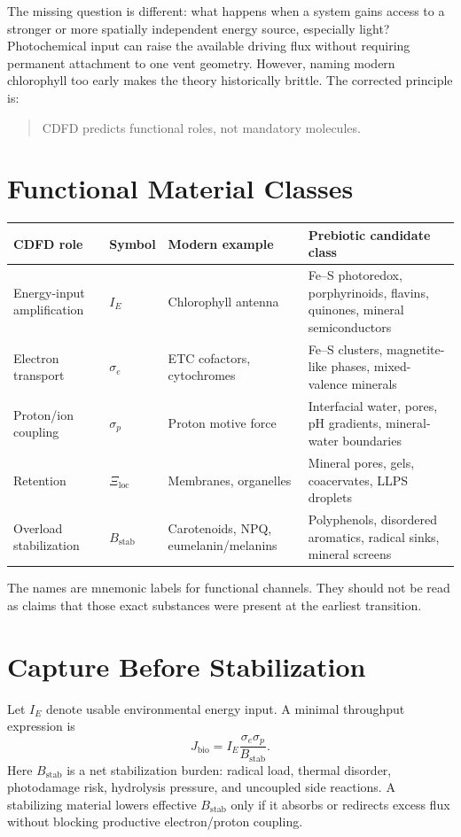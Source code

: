 \documentclass[11pt,a4paper]{article}
\begin{document}
The missing question is different: what happens when a system gains access to a stronger or more spatially independent energy source, especially light? Photochemical input can raise the available driving flux without requiring permanent attachment to one vent geometry. However, naming modern chlorophyll too early makes the theory historically brittle. The corrected principle is:
\begin{quote}
CDFD predicts functional roles, not mandatory molecules.
\end{quote}

\section{Functional Material Classes}
\begin{center}
\small
\begin{tabular}{p{}p{}p{}p{}}
\toprule
CDFD role & Symbol & Modern example & Prebiotic candidate class \\
\midrule
Energy-input amplification & $I_E$ & Chlorophyll antenna & Fe--S photoredox, porphyrinoids, flavins, quinones, mineral semiconductors \\
Electron transport & $\sigma_e$ & ETC cofactors, cytochromes & Fe--S clusters, magnetite-like phases, mixed-valence minerals \\
Proton/ion coupling & $\sigma_p$ & Proton motive force & Interfacial water, pores, pH gradients, mineral-water boundaries \\
Retention & $\Xi_{\mathrm{loc}}$ & Membranes, organelles & Mineral pores, gels, coacervates, LLPS droplets \\
Overload stabilization & $B_{\mathrm{stab}}$ & Carotenoids, NPQ, eumelanin/melanins & Polyphenols, disordered aromatics, radical sinks, mineral screens \\
\bottomrule
\end{tabular}
\end{center}
The names are mnemonic labels for functional channels. They should not be read as claims that those exact substances were present at the earliest transition.

\section{Capture Before Stabilization}
Let $I_E$ denote usable environmental energy input. A minimal throughput expression is
\begin{equation}
 J_{\mathrm{bio}}=I_E\frac{\sigma_e\sigma_p}{B_{\mathrm{stab}}}.
 \label{eq:functional-throughput}
\end{equation}
Here $B_{\mathrm{stab}}$ is a net stabilization burden: radical load, thermal disorder, photodamage risk, hydrolysis pressure, and uncoupled side reactions. A stabilizing material lowers effective $B_{\mathrm{stab}}$ only if it absorbs or redirects excess flux without blocking productive electron/proton coupling.
\end{document}
